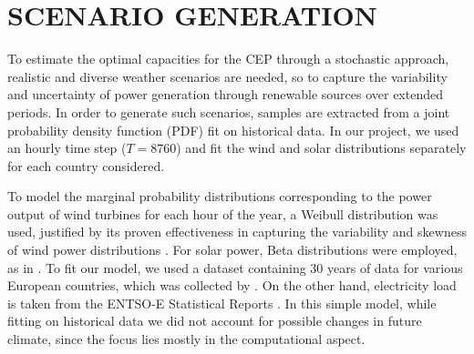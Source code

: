 














\newpage
\appendix

\section{SCENARIO GENERATION}\label{generation}

To estimate the optimal capacities for the CEP through a stochastic approach, realistic and diverse weather scenarios are needed, so to capture the variability and uncertainty of power generation through renewable sources over extended periods. 
In order to generate such scenarios, samples are extracted from a joint probability density function (PDF) fit on historical data. 
In our project, we used an hourly time step ($T=8760$) and fit the wind and solar distributions separately for each country considered.

To model the marginal probability distributions corresponding to the power output of wind turbines for each hour of the year, a Weibull distribution was used, justified by its proven effectiveness in capturing the variability and skewness of wind power distributions \textcolor{green}{\cite{weibullwind}}. 
For solar power, Beta distributions were employed, as in \textcolor{green}{\cite{betaPV}}.
To fit our model, we used a dataset containing 30 years of data for various European countries, which was collected by \textcolor{green}{\cite{30y_gen}}. 
On the other hand, electricity load is taken from the ENTSO-E Statistical Reports \textcolor{green}{\cite{ENTSOE_PowerStats}}.
In this simple model, while fitting on historical data we did not account for possible changes in future climate, since the focus lies mostly in the computational aspect.

